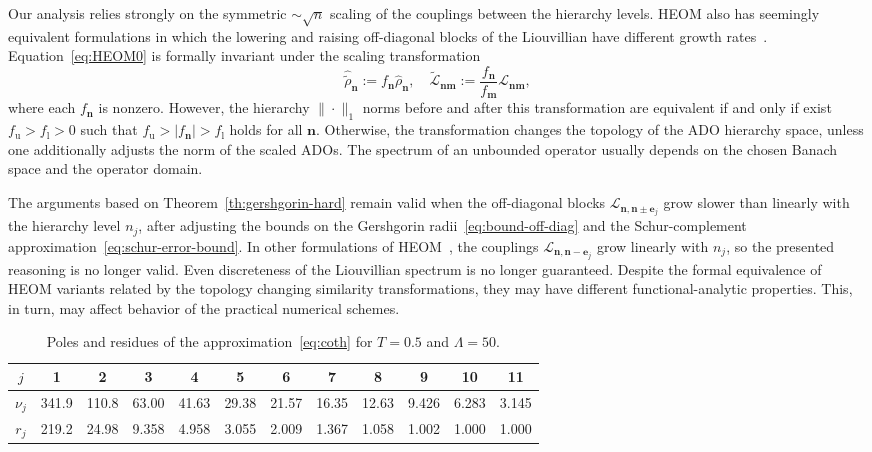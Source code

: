 \documentclass{SciPost}
\begin{document}
Our analysis relies strongly on the symmetric $\sim \sqrt{n}$ scaling of the couplings between the hierarchy levels. HEOM also has seemingly equivalent formulations in which the lowering and raising off-diagonal blocks of the Liouvillian have different growth rates~\cite{Shi2009, Zhu2011, Chen2024}. Equation~\eqref{eq:HEOM0} is formally invariant under the scaling transformation
\begin{equation}
    \hat{\tilde \rho}_{\bm n} := f_{\bm n} \hat \rho_{\bm n},\quad
    \tilde{\mathcal L}_{\bm n \bm m} := \frac{f_{\bm n}}{f_{\bm m}} \mathcal L_{\bm n \bm m},
\end{equation}
where each $f_{\bm n}$ is nonzero. However, the hierarchy $\|\cdot\|_1$ norms before and after this transformation are equivalent if and only if exist $f_\mathrm u > f_\mathrm l > 0$ such that $f_\mathrm u > |f_{\bm n}| > f_\mathrm l$ holds for all $\bm n$. Otherwise, the transformation changes the topology of the ADO hierarchy space, unless one additionally adjusts the norm of the scaled ADOs. The spectrum of an unbounded operator usually depends on the chosen Banach space and the operator domain.

The arguments based on Theorem~\ref{th:gershgorin-hard} remain valid when the off-diagonal blocks $\mathcal L_{\bm n,\bm n\pm\bm e_j}$ grow slower than linearly with the hierarchy level $n_j$, after adjusting the bounds on the Gershgorin radii~\eqref{eq:bound-off-diag} and the Schur-complement approximation~\eqref{eq:schur-error-bound}. In other formulations of HEOM~\cite{Ishizaki2005, Tanimura2006}, the couplings $\mathcal L_{\bm n,\bm n-\bm e_j}$ grow linearly with $n_j$, so the presented reasoning is no longer valid. Even discreteness of the Liouvillian spectrum is no longer guaranteed. Despite the formal equivalence of HEOM variants related by the topology changing similarity transformations, they may have different functional-analytic properties. This, in turn, may affect behavior of the practical numerical schemes.

\begin{table}[t]
    \caption{Poles and residues of the approximation~\eqref{eq:coth} for $T = 0.5$ and $\Lambda = 50$.}
    \begin{center}
        \begin{tabular}{c|c|c|c|c|c|c|c|c|c|c|c}
            \hline\hline
            $j$ & 1 & 2 & 3 & 4 & 5 & 6 & 7 & 8 & 9 & 10 & 11 \\
            \hline
            $\nu_{j}$ &
            341.9 &
            110.8 &
            63.00 &
            41.63 &
            29.38 &
            21.57 &
            16.35 &
            12.63 &
            9.426 &
            6.283 &
            3.145 \\
            \hline
            $r_j$ &
            219.2 &
            24.98 &
            9.358 &
            4.958 &
            3.055 &
            2.009 &
            1.367 &
            1.058 &
            1.002 &
            1.000 &
            1.000 \\
            \hline\hline
        \end{tabular}
    \end{center}
    \label{tab:coth}
\end{table}
\end{document}
